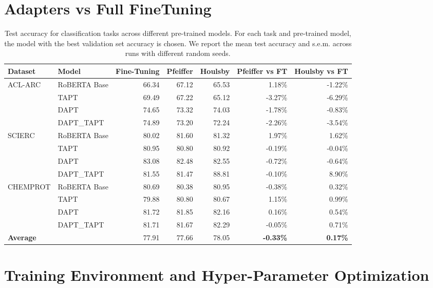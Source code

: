 \documentclass[10pt,twocolumn,letterpaper]{article}
\begin{document}
\section{Adapters vs Full FineTuning}
\begin{table}[h]
\centering

\begin{tabular}{llrrrrr}
\hline
\textbf{Dataset} & \textbf{Model} & \textbf{Fine-Tuning} & \textbf{Pfeiffer} & \textbf{Houlsby} & \textbf{Pfeiffer vs FT} & \textbf{Houlsby vs FT} \\
\hline
ACL-ARC & RoBERTA Base & 66.34 & 67.12 & 65.53 & 1.18\% & -1.22\% \\
& TAPT & 69.49 & 67.22 & 65.12 & -3.27\% & -6.29\% \\
& DAPT & 74.65 & 73.32 & 74.03 & -1.78\% & -0.83\% \\
& DAPT\_TAPT & 74.89 & 73.20 & 72.24 & -2.26\% & -3.54\% \\
\hline
SCIERC & RoBERTA Base & 80.02 & 81.60 & 81.32 & 1.97\% & 1.62\% \\
& TAPT & 80.95 & 80.80 & 80.92 & -0.19\% & -0.04\% \\
& DAPT & 83.08 & 82.48 & 82.55 & -0.72\% & -0.64\% \\
& DAPT\_TAPT & 81.55 & 81.47 & 88.81 & -0.10\% & 8.90\% \\
\hline
CHEMPROT & RoBERTA Base & 80.69 & 80.38 & 80.95 & -0.38\% & 0.32\% \\
& TAPT & 79.88 & 80.80 & 80.67 & 1.15\% & 0.99\% \\
& DAPT & 81.72 & 81.85 & 82.16 & 0.16\% & 0.54\% \\
& DAPT\_TAPT & 81.71 & 81.67 & 82.29 & -0.05\% & 0.71\% \\
\hline
\multicolumn{2}{l}{\textbf{Average}} & 77.91 & 77.66 & 78.05 & \textbf{-0.33\%} & \textbf{0.17\%} \\
\hline
\end{tabular}
\caption{Test accuracy for classification tasks across different pre-trained models. For each task and pre-trained model, the model with the best validation set accuracy is chosen. We report the mean test accuracy and s.e.m. across runs with
different random seeds.}
\label{table:adaptersvsft}
\end{table}
\FloatBarrier

\newpage{}
\section{Training Environment and Hyper-Parameter Optimization}
\label{sec:besthyperparameters}
\end{document}
